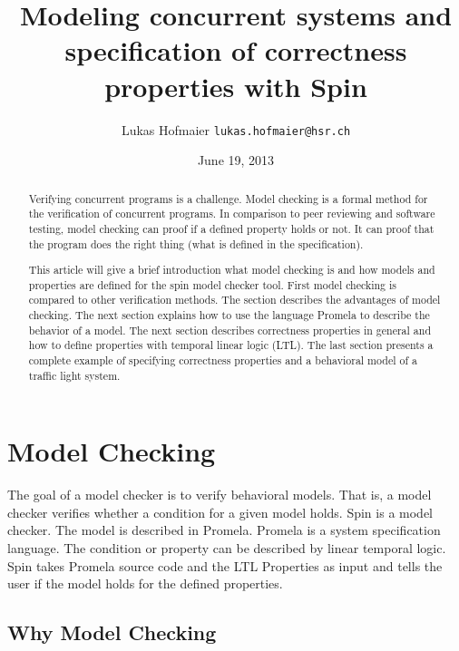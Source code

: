 \documentclass[12pt,a4paper,twoside]{article}
\begin{document}
\lstset{
basicstyle=\small\ttfamily,
xleftmargin=3.5em,
language=Promela,
captionpos=b
}

\title{Modeling concurrent systems and specification of correctness properties with Spin}
\author{Lukas Hofmaier \texttt{lukas.hofmaier@hsr.ch}}
\date{June 19, 2013}

\maketitle

\begin{abstract}
  Verifying concurrent programs is a challenge. Model checking is a formal method for the verification of concurrent programs. In comparison to peer reviewing and software testing, model checking can proof if a defined property holds or not. It can proof that the program does the right thing (what is defined in the specification).

This article will give a brief introduction what model checking is and how models and properties are defined for the spin model checker tool. First model checking is compared to other verification methods. The section describes the advantages of model checking. The next section explains how to use the language Promela to describe the behavior of a model. The next section describes correctness properties in general and how to define properties with temporal linear logic (LTL). The last section presents a complete example of specifying correctness properties and a behavioral model of a traffic light system.
\end{abstract}

\section{Model Checking}
\label{sec:modelchecking}

The goal of a model checker is to verify behavioral models. That is, a model checker verifies whether a condition for a given model holds. Spin is a model checker. The model is described in Promela. Promela is a system specification language. The condition or property can be described by linear temporal logic.  Spin takes Promela source code and the LTL Properties as input and tells the user if the model holds for the defined properties.

\subsection{Why Model Checking}
\label{sec:why}
\end{document}
